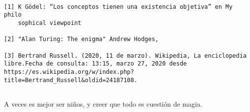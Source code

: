 \documentclass{article}
\begin{document}
\begin{verbatim}
 
[1] K Gödel: “Los conceptos tienen una existencia objetiva” en My philo
    sophical viewpoint
    
[2] "Alan Turing: The enigma" Andrew Hodges,
    
[3] Bertrand Russell. (2020, 11 de marzo). Wikipedia, La enciclopedia libre.Fecha de consulta: 13:15, marzo 27, 2020 desde https://es.wikipedia.org/w/index.php?title=Bertrand_Russell&oldid=24187108.
    

\end{verbatim}



A veces es mejor ser niños, y creer que todo es cuestión de magia.
\end{document}
